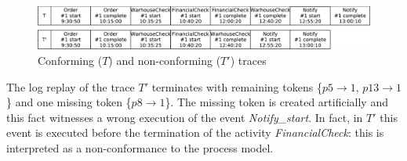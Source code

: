 \documentclass{llncs}
\begin{document}

\begin{figure}[h]
\centering
\includegraphics[width=0.9\linewidth]
{./items/logConforme.pdf}
\caption{Conforming ($T$) and non-conforming ($T'$) traces}
\label{ConfLog}
\end{figure}


The log replay of the trace $T'$ terminates with remaining tokens \{$p5 \rightarrow 1$, $p13 \rightarrow 1$\} and one missing token \{${p8 \rightarrow 1}$\}. The missing token is created artificially and this fact witnesses a wrong execution of the event \emph{Notify\_start}. In fact, in $T'$ this event is executed before the termination of the activity \emph{FinancialCheck}: this is interpreted as a non-conformance to the process model. 

\end{document}
